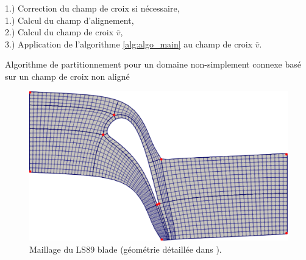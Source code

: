 \vspace{0.5cm}
\begin{algorithm}[H]
\label{alg:algo_non_simply_connected}
\vspace{0.2cm}
1.) Correction du champ de croix si nécessaire,\\\vspace{0.2cm}
1.) Calcul du champ d'alignement,\\\vspace{0.2cm}
2.) Calcul du champ de croix $\bar{v}$,\\\vspace{0.2cm}
3.) Application de l'algorithme \ref{alg:algo_main} au champ de croix $\bar{v}$.\\\vspace{0.2cm}
\caption{Algorithme de partitionnement pour un domaine non-simplement connexe basé sur un champ de croix non aligné}
\end{algorithm}
\vspace{0.5cm}

\begin{figure}[!h]
\centering
\includegraphics[scale=0.5]{images/LS89_bis.pdf}
\caption{Maillage du LS89 blade (géométrie détaillée dans \cite{gourdain2010advanced}).}
\label{LS89}
\end{figure}

